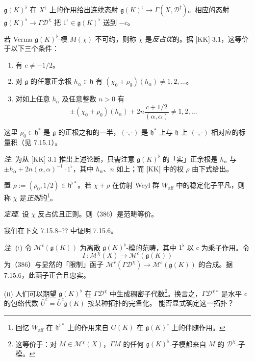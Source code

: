 $\mathfrak{g}(K)^{\flat}$ 在 $X^{\dagger}$ 上的作用给出连续态射 $\mathfrak{g}(K)^{\flat}\to\Gamma(X,\mathcal{D}^{\dagger})$。相应的态射 $\mathfrak{g}(K)^{\flat}\to\Gamma\mathcal{D}^{\chi}$ 把 $1^{\flat}\in\mathfrak{g}(K)^{\flat}$ 送到 $-c$。

 若 Verma $\mathfrak{g}(K)^{\flat}$-模 $M(\chi)$ 不可约，则称 $\chi$ 是\emph{反占优}的。据 [KK] 3.1，这等价于以下三个条件：
\begin{enumerate}[label=(\roman*),leftmargin=2.2em]
\item 有 $c\ne-1/2$。
%
\item 对 $\mathfrak{g}$ 的任意正余根 $h_{\alpha}\in\mathfrak{h}$ 有 $(\chi_0+\rho_0)(h_{\alpha})\ne1,2,\ldots$。
\item 对如上任意 $h_{\alpha}$ 及任意整数 $n>0$ 有
\[
\pm(\chi_0+\rho_0)(h_{\alpha})+2n\frac{c+1/2}{(\alpha,\alpha)}\ne1,2,\ldots
\]
\end{enumerate}

这里 $\rho_0\in\mathfrak{h}^{*}$ 是 $\mathfrak{g}$ 的正根之和的一半，$(\cdot,\cdot)$ 是 $\mathfrak{h}^{*}$ 上与 $\mathfrak{h}$ 上 $(\cdot,\cdot)$ 相对应的标量积（见 7.15.1）。

\emph{注.} 为从 [KK] 3.1 推出上述论断，只需注意 $\mathfrak{g}(K)^{\flat}$ 的「实」正余根是 $h_{\alpha}$ 与 $\pm h_{\alpha}+2n(\alpha,\alpha)^{-1}\cdot1^{\flat}$，其中 $h_{\alpha}$、$n$ 如上；而 [KK] 中的权 $\rho$ 由下式给出。

置 $\rho:=(\rho_0,1/2)\in\mathfrak{h}^{\flat*}$。若 $\chi+\rho$ 在仿射 Weyl 群 $W_{\mathrm{aff}}$ 中的稳定化子平凡，则称 $\chi$ 是\emph{正则}的\footnote{回忆 $W_{\mathrm{aff}}$ 在 $\mathfrak{h}^{\flat*}$ 上的作用来自 $G(K)$ 在 $\mathfrak{g}(K)^{\flat}$ 上的伴随作用。}。

 \emph{定理.} 设 $\chi$ 反占优且正则。则（386）是范畴等价。

我们在下文 7.15.8--?? 中证明 7.15.6。

 \emph{注.} (i) 令 $\mathcal{M}^{c}(\mathfrak{g}(K))$ 为离散 $\mathfrak{g}(K)^{\flat}$-模的范畴，其中 $1^{\flat}$ 以 $c$ 为乘子作用。令
\begin{equation}\tag{387}
\Gamma:\mathcal{M}^{\chi}(X)\to\mathcal{M}^{c}(\mathfrak{g}(K))
\end{equation}
为（386）与显然的「限制」函子 $\mathcal{M}^{r}(\Gamma\mathcal{D}^{\chi})\to\mathcal{M}^{c}(\mathfrak{g}(K))$ 的合成。据 7.15.6，此函子正合且忠实。

(ii) 人们可以期望 $\mathfrak{g}(K)^{\flat}$ 在 $\Gamma\mathcal{D}^{\chi}$ 中生成稠密子代数\footnote{这等价于：对 $M\in\mathcal{M}^{\chi}(X)$，$\Gamma M$ 的任何 $\mathfrak{g}(K)^{\flat}$-子模都来自 $M$ 的 $\mathcal{D}^{\chi}$-子模。}。换言之，$\Gamma\mathcal{D}^{\chi\circ}$ 是水平 $c$ 的包络代数 $\bar U^{c}=\bar U^{c}\mathfrak{g}(K)$ 按某种拓扑的完备化。%
能否显式确定这一拓扑？

